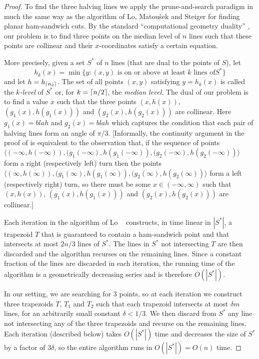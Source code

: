 \documentclass[lotsofwhite]{patmorin}
\begin{document}
\begin{proof}

To find the three halving lines we apply the prune-and-search paradigm
in much the same way as the algorithm of Lo, Matou\v{s}ek and Steiger
\cite{lms94} for finding planar ham-sandwich cuts.  By the standard
``computational geometry duality'' \cite[Section~1.3.3]{bkoo97}, our problem
is to find three points on the median level of $n$ lines such that
these points are collinear and their $x$-coordinates satisfy a certain
equation.  

More precisely, given a set $S^*$ of $n$ lines (that are dual to the
points of $S$), let
\[
    h_k(x) = \min\{ y : 
        \mbox{$(x,y)$ is on or above at least $k$ lines of
$S^*$}\} 
\]
and let $h=h_{\left\lceil n_2 \right\rceil}$.  The set of all points $(x,y)$ satisfying
$y=h_k(x)$ is called the \emph{$k$-level} of $S^*$ or, for
$k=\left\lceil n/2 \right\rceil$, the \emph{median level}.
The dual of our problem is to find a value $x$ such that the three points
$(x,h(x))$, $(g_1(x),h(g_1(x)))$ and $(g_2(x),h(g_2(x)))$ are collinear.
Here $g_1(x)=blah$ and
$g_2(x)=blah$ which captures the condition that each pair of halving
lines form an angle of $\pi/3$.  [Informally, the continuity argument in
the proof of  is equivalent to the observation
that, if the sequence of points $\langle(-\infty,h(-\infty)),
(g_1(-\infty),h(g_1(-\infty)), (g_2(-\infty),h(g_2(-\infty))\rangle$ form
a right (respectively left) turn then the points $\langle(\infty,h(\infty)),
(g_1(\infty),h(g_1(\infty)), (g_2(\infty),h(g_2(\infty))\rangle$ form a
left (respectively right) turn, so there must be some
$x\in(-\infty,\infty)$ such that 
$(x,h(x))$, $(g_1(x),h(g_1(x)))$ and $(g_2(x),h(g_2(x)))$ are
collinear.]

Each iteration in the algorithm of Lo \etal\ \cite{lms94} constructs,
in time linear in $|S^*|$, a trapezoid $T$ that is guaranteed to
contain a ham-sandwich point and that intersects at most $2n/3$ lines
of $S^*$.  The lines in $S^*$ not intersecting $T$ are then discarded
and the algorithm recurses on the remaining lines.  Since a constant
fraction of the lines are discarded in each iteration, the running
time of the algorithm is a geometrically decreasing series and is
therefore $O(|S^*|)$.

In our setting, we are searching for 3 points, so at each iteration we
construct three trapezoids $T$, $T_1$ and $T_2$ such that each
trapezoid intersects at most $\delta m$ lines, for an arbitrarily
small constant $\delta < 1/3$.  We then discard from $S^*$ any line
not intersecting any of the three trapezoids and recurse on the
remaining lines.  Each iteration (described below) takes $O(|S^*|)$
time and decreases the size of $S^*$ by a factor of $3\delta$, so the
entire algorithm runs in $O(|S^*|)=O(n)$ time.


\end{proof}
\end{document}
